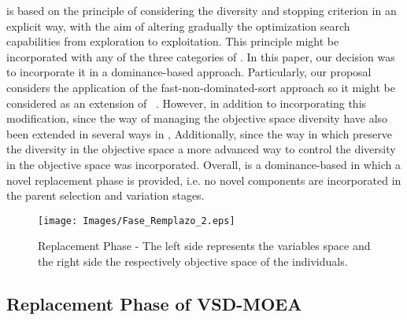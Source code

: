 \VSDMOEA{} is based on the principle of considering the diversity and stopping criterion in an explicit way, with the aim of altering gradually the optimization
search capabilities from exploration to exploitation.
%
This principle might be incorporated with any of the three categories of \MOEAS{}.
%
In this paper, our decision was to incorporate it in a dominance-based approach.
%
Particularly, our proposal considers the application of the fast-non-dominated-sort approach so it might be considered as an extension
of \NSGAII{}~\cite{Joel:NSGAII}.
%
However, in addition to incorporating this modification, since the way of managing the objective space diversity have also been extended in several ways in \NSGAII{},
Additionally, since the way in which \NSGAII{} preserve the diversity in the objective space  
a more advanced way to control the diversity in the objective space was incorporated.
%
Overall, \VSDMOEA{} is a dominance-based \MOEA{} in which a novel replacement phase is provided,
i.e. no novel components are incorporated in the parent selection and variation stages.

\begin{figure}[t]
\centering
\texttt{[image: Images/Fase\_Remplazo\_2.eps]}
\caption{Replacement Phase - The left side represents the variables space and the right side the respectively objective space of the individuals.  }
\label{fig:Hypersphere}
\end{figure}


\subsection{Replacement Phase of VSD-MOEA}

